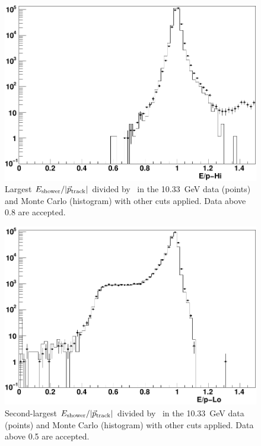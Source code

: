 \documentclass{cornell}
\begin{document}
\begin{figure}[p]
  \begin{center}
    \includegraphics[width=0.7\linewidth]{plots/eeagreementf}
  \end{center}
  \caption{\label{eeagreemente} Largest
  $E_{\mbox{\scriptsize shower}}/|\vec{p}_{\mbox{\scriptsize track}}|$ divided by \ebeam\ in the
  10.33~GeV data (points) and Monte Carlo (histogram) with other cuts
  applied.  Data above 0.8 are accepted.}
\end{figure}

\begin{figure}[p]
  \begin{center}
    \includegraphics[width=0.7\linewidth]{plots/eeagreementg}
  \end{center}
  \caption{\label{eeagreementf} Second-largest
  $E_{\mbox{\scriptsize shower}}/|\vec{p}_{\mbox{\scriptsize track}}|$ divided by \ebeam\ in the
  10.33~GeV data (points) and Monte Carlo (histogram) with other cuts
  applied.  Data above 0.5 are accepted.}
\end{figure}
\end{document}
